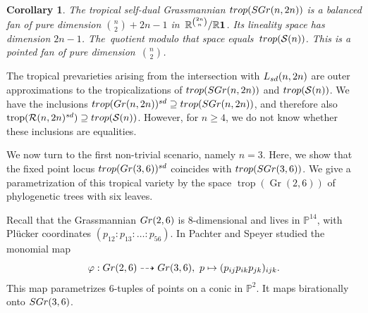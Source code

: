 \documentclass[12pt]{extarticle}
\newtheorem{corollary}[theorem]{Corollary}
\theoremstyle{definition}
\numberwithin{theorem}{section}
\theoremstyle{plain}\newtheorem{ithm}{Theorem}
\newcommand{\PP}{\mathbb{P}}
\newcommand{\RR}{\mathbb{R}}
\DeclareMathOperator{\trop}{trop}
\DeclareMathOperator{\Gr}{Gr}
\begin{document}
  \begin{corollary}
    The tropical self-dual Grassmannian $ {\rm trop}({\rm SGr}(n,2n)) $ is
    a balanced fan of pure dimension $\binom{n}{2} +2n-1$ in $\,\RR^{\binom{2n}{n}}/\RR {\bf 1}$.
    Its lineality space has  dimension $2n-1$. The~quotient modulo that  space equals
    $ \,{\rm trop}(\mathcal{S}(n))$. This is a pointed fan of pure dimension~$\binom{n}{2}$.
  \end{corollary}
  
  The tropical prevarieties arising from the intersection with $L_{\rm sd}(n,2n)$
 are outer approximations to the tropicalizations of
  ${\rm trop}({\rm SGr}(n,2n))$ and $ {\rm trop}(\mathcal{S}(n))$. 
  We have the inclusions ${\rm trop}({\rm Gr}(n,2n))^{\rm sd} \supseteq {\rm trop}({\rm SGr}(n,2n))$,
  and therefore also  $\trop(\mathcal{R}(n,2n)^{\rm sd}) \supseteq {\rm trop}(\mathcal{S}(n))$.
  However, for $n \geq 4$, we do not know whether these inclusions are equalities.
  

We now turn to the first non-trivial scenario, namely $n=3$. Here, we show that the fixed point locus ${\rm trop}({\rm Gr}(3,6))^{\rm sd}$ coincides with ${\rm trop}({\rm SGr}(3,6))$. We give a 
parametrization of this tropical variety by  the space $\trop( \Gr(2,6))$
of phylogenetic trees with six leaves.

Recall that the Grassmannian ${\rm Gr}(2,6)$ is $8$-dimensional and lives in $\PP^{14}$, with Pl\"ucker coordinates $(p_{12}:p_{13}:\ldots:p_{56})$. In \cite{PS} Pachter and Speyer studied the monomial map 
\begin{equation}
\label{eq:PachterSpeyer}
    \varphi: {\rm Gr}(2,6) \dashrightarrow {\rm Gr}(3,6) ,\,\, p \mapsto (p_{ij} p_{ik} p_{jk})_{ijk}.
\end{equation}
  This map parametrizes 6-tuples of points on a conic in $\PP^2$. It maps birationally onto ${\rm SGr}(3,6)$.

  
  
\end{document}

